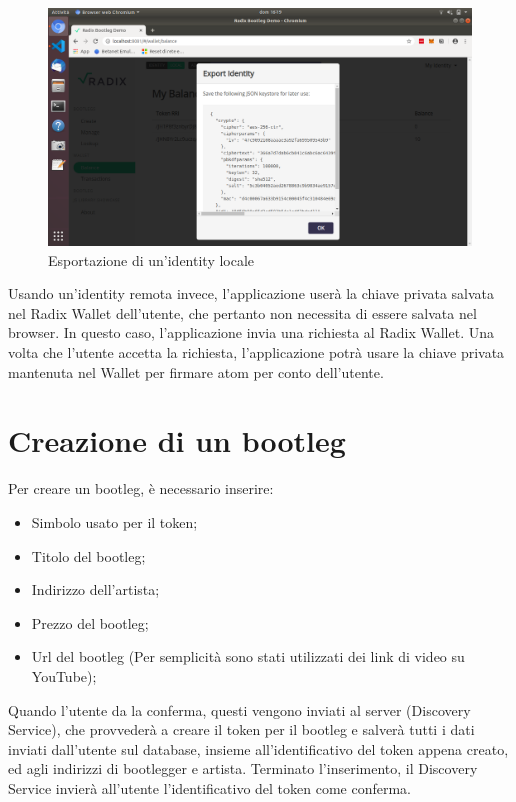 \begin{figure}[H]
  \centering
  \includegraphics[width=\linewidth]{images/application/save-keystore.png}
  \caption{Esportazione di un'identity locale}
  \label{fig:trex}
\end{figure}

Usando un'identity remota invece, l'applicazione userà la chiave privata salvata nel Radix Wallet dell'utente, che pertanto non necessita di essere salvata nel browser. In questo caso, l'applicazione invia una richiesta al Radix Wallet. Una volta che l'utente accetta la richiesta, l'applicazione potrà usare la chiave privata mantenuta nel Wallet per firmare atom per conto dell'utente. 

\section{Creazione di un bootleg}

Per creare un bootleg, è necessario inserire:
\begin{itemize}
    \item Simbolo usato per il token;
    \item Titolo del bootleg;
    \item Indirizzo dell'artista;
    \item Prezzo del bootleg;
    \item Url del bootleg (Per semplicità sono stati utilizzati dei link di video su YouTube);
\end{itemize}

Quando l'utente da la conferma, questi vengono inviati al server (Discovery Service), che provvederà a creare il token per il bootleg e salverà tutti i dati inviati dall'utente sul database, insieme all'identificativo del token appena creato, ed agli indirizzi di bootlegger e artista. Terminato l'inserimento, il Discovery Service invierà all'utente l'identificativo del token come conferma.

